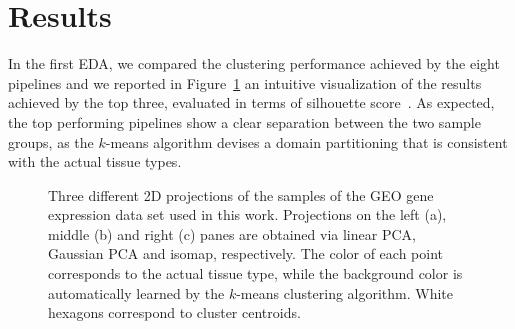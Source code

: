 \section{Results} \label{sec:results}

In the first EDA, we compared the clustering performance achieved by the eight \ade pipelines and we reported in Figure~\ref{fig:scatter} an intuitive visualization of the results achieved by the top three, evaluated in terms of silhouette score~\cite{rousseeuw1987silhouettes}. As expected, the top performing pipelines show a clear separation between the two sample groups, as the $k$-means algorithm devises a domain partitioning that is consistent with the actual tissue types.

\begin{figure}[!ht]
    \centering
    \hfill%
    \hfill%
    \caption{\small Three different 2D projections of the samples of the GEO gene expression data set used in this work. Projections on the left (a), middle (b) and right (c) panes are obtained via linear PCA, Gaussian PCA and isomap, respectively. The color of each point corresponds to the actual tissue type, while the background color is automatically learned by the $k$-means clustering algorithm. White hexagons correspond to cluster centroids.}\label{fig:scatter}
\end{figure}

